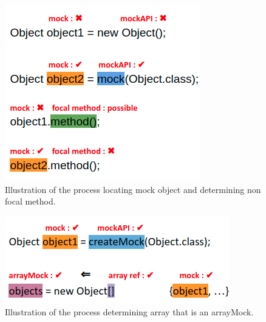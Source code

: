 \begin{figure}
	\includegraphics[width=.25\textwidth]{Images/mockFocalMethodIllustration.png}
	
	\caption{Illustration of the process locating mock object and determining non focal method.}
	\label{fig:focalMethodIllustration}
	
\end{figure}

\begin{figure}
	\includegraphics[width=.25\textwidth]{Images/arrayMockIllustration.png}
	
	\caption{Illustration of the process determining array that is an arrayMock.}
	\label{fig:arrayMockIllustration}
	
\end{figure}